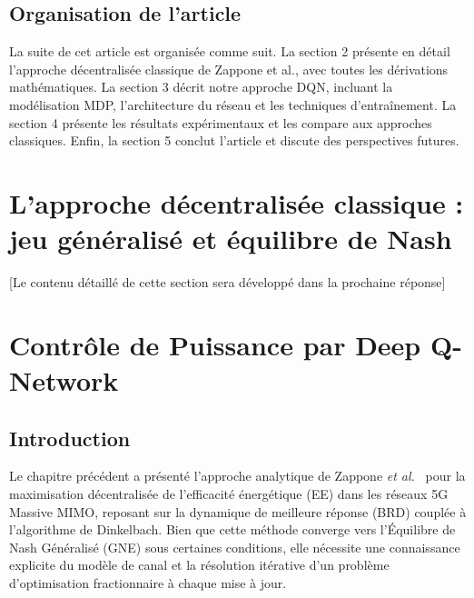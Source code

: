 \documentclass[conference]{IEEEtran}
\begin{document}
\subsection{Organisation de l'article}

La suite de cet article est organisée comme suit. La section 2 présente en détail l'approche décentralisée classique de Zappone et al., avec toutes les dérivations mathématiques. La section 3 décrit notre approche DQN, incluant la modélisation MDP, l'architecture du réseau et les techniques d'entraînement. La section 4 présente les résultats expérimentaux et les compare aux approches classiques. Enfin, la section 5 conclut l'article et discute des perspectives futures.

\section{L'approche décentralisée classique : jeu généralisé et équilibre de Nash}

[Le contenu détaillé de cette section sera développé dans la prochaine réponse]


\section{Contrôle de Puissance par Deep Q-Network}
\label{chap:dqn}

\subsection{Introduction}

Le chapitre précédent a présenté l'approche analytique de Zappone \textit{et al.}~\cite{zappone2015} pour la maximisation décentralisée de l'efficacité énergétique (EE) dans les réseaux 5G Massive MIMO, reposant sur la dynamique de meilleure réponse (BRD) couplée à l'algorithme de Dinkelbach. Bien que cette méthode converge vers l'Équilibre de Nash Généralisé (GNE) sous certaines conditions, elle nécessite une connaissance explicite du modèle de canal et la résolution itérative d'un problème d'optimisation fractionnaire à chaque mise à jour.
\end{document}
